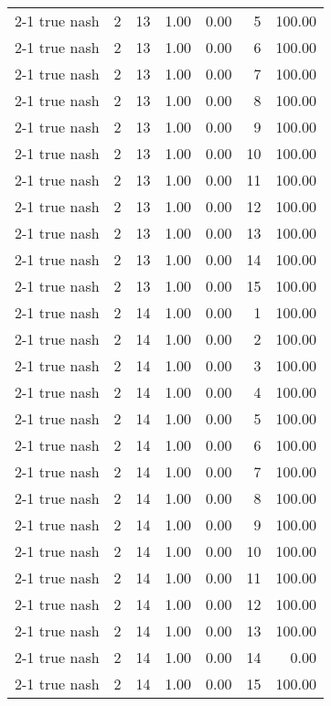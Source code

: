 \begin{tabular}{lrrrrrr}
2-1  true nash & 2 & 13 & 1.00 & 0.00 & 5 & 100.00 \\
2-1  true nash & 2 & 13 & 1.00 & 0.00 & 6 & 100.00 \\
2-1  true nash & 2 & 13 & 1.00 & 0.00 & 7 & 100.00 \\
2-1  true nash & 2 & 13 & 1.00 & 0.00 & 8 & 100.00 \\
2-1  true nash & 2 & 13 & 1.00 & 0.00 & 9 & 100.00 \\
2-1  true nash & 2 & 13 & 1.00 & 0.00 & 10 & 100.00 \\
2-1  true nash & 2 & 13 & 1.00 & 0.00 & 11 & 100.00 \\
2-1  true nash & 2 & 13 & 1.00 & 0.00 & 12 & 100.00 \\
2-1  true nash & 2 & 13 & 1.00 & 0.00 & 13 & 100.00 \\
2-1  true nash & 2 & 13 & 1.00 & 0.00 & 14 & 100.00 \\
2-1  true nash & 2 & 13 & 1.00 & 0.00 & 15 & 100.00 \\
2-1  true nash & 2 & 14 & 1.00 & 0.00 & 1 & 100.00 \\
2-1  true nash & 2 & 14 & 1.00 & 0.00 & 2 & 100.00 \\
2-1  true nash & 2 & 14 & 1.00 & 0.00 & 3 & 100.00 \\
2-1  true nash & 2 & 14 & 1.00 & 0.00 & 4 & 100.00 \\
2-1  true nash & 2 & 14 & 1.00 & 0.00 & 5 & 100.00 \\
2-1  true nash & 2 & 14 & 1.00 & 0.00 & 6 & 100.00 \\
2-1  true nash & 2 & 14 & 1.00 & 0.00 & 7 & 100.00 \\
2-1  true nash & 2 & 14 & 1.00 & 0.00 & 8 & 100.00 \\
2-1  true nash & 2 & 14 & 1.00 & 0.00 & 9 & 100.00 \\
2-1  true nash & 2 & 14 & 1.00 & 0.00 & 10 & 100.00 \\
2-1  true nash & 2 & 14 & 1.00 & 0.00 & 11 & 100.00 \\
2-1  true nash & 2 & 14 & 1.00 & 0.00 & 12 & 100.00 \\
2-1  true nash & 2 & 14 & 1.00 & 0.00 & 13 & 100.00 \\
2-1  true nash & 2 & 14 & 1.00 & 0.00 & 14 & 0.00 \\
2-1  true nash & 2 & 14 & 1.00 & 0.00 & 15 & 100.00 \\
\bottomrule
\end{tabular}
